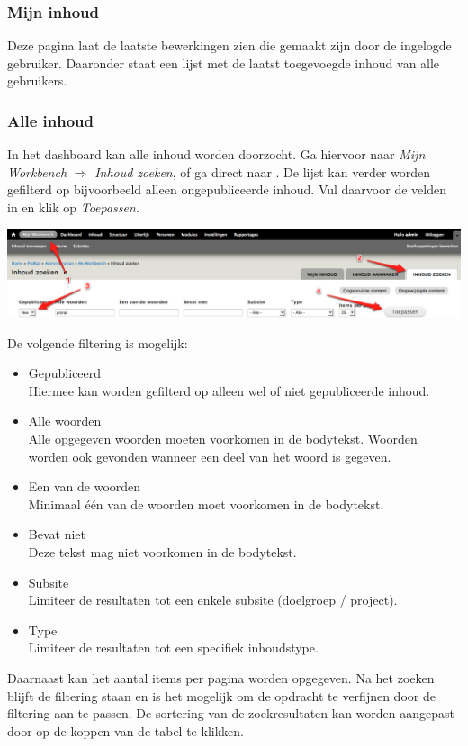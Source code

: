 \subsubsection{Mijn inhoud}\label{mijninhoud}

Deze pagina laat de laatste bewerkingen zien die gemaakt zijn door de ingelogde gebruiker. Daaronder staat een lijst met de laatst toegevoegde inhoud van alle gebruikers.

\subsubsection{Alle inhoud}\label{alleinhoud}
In het dashboard kan alle inhoud worden doorzocht. Ga hiervoor naar \emph{Mijn Workbench} $\Rightarrow$ \emph{Inhoud zoeken}, of ga direct naar . De lijst kan verder worden gefilterd op bijvoorbeeld alleen ongepubliceerde inhoud. Vul daarvoor de velden in en klik op \emph{Toepassen}.
\begin{center}
\includegraphics[width=\textwidth]{img/ongepubliceerdeinhoud.png}
\end{center}
De volgende filtering is mogelijk:
\begin{itemize}
\item Gepubliceerd \\
Hiermee kan worden gefilterd op alleen wel of niet gepubliceerde inhoud.
\item Alle woorden \\
Alle opgegeven woorden moeten voorkomen in de bodytekst. Woorden worden ook gevonden wanneer een deel van het woord is gegeven.
\item Een van de woorden \\
Minimaal \'{e}\'{e}n van de woorden moet voorkomen in de bodytekst.
\item Bevat niet \\
Deze tekst mag niet voorkomen in de bodytekst.
\item Subsite \\
Limiteer de resultaten tot een enkele subsite (doelgroep / project).
\item Type \\
Limiteer de resultaten tot een specifiek inhoudstype.
\end{itemize}
Daarnaast kan het aantal items per pagina worden opgegeven. Na het zoeken blijft de filtering staan en is het mogelijk om de opdracht te verfijnen door de filtering aan te passen. De sortering van de zoekresultaten kan worden aangepast door op de koppen van de tabel te klikken.

